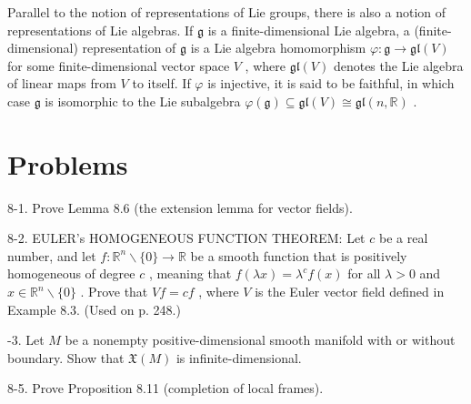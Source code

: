 \begin{definition}
\label{def:8-62-extra-1}
\mathlibok
Parallel to the notion of representations of Lie groups, there is also a notion of representations of Lie algebras. If $\mathfrak{g}$ is a finite-dimensional Lie algebra, a (finite-dimensional) representation of $\mathfrak{g}$ is a Lie algebra homomorphism $\varphi  : \mathfrak{g} \rightarrow  \mathfrak{{gl}}\left( V\right)$ for some finite-dimensional vector space $V$ , where $\mathfrak{{gl}}\left( V\right)$ denotes the Lie algebra of linear maps from $V$ to itself. If $\varphi$ is injective, it is said to be faithful, in which case $\mathfrak{g}$ is isomorphic to the Lie subalgebra $\varphi \left( \mathfrak{g}\right)  \subseteq  \mathfrak{{gl}}\left( V\right)  \cong  \mathfrak{{gl}}\left( {n,\mathbb{R}}\right)$ .
\end{definition}


\section{Problems}

\begin{exercise}
\label{prob:8-1}
\leanok
{}
8-1. Prove Lemma 8.6 (the extension lemma for vector fields).
\end{exercise}

\begin{exercise}
\label{prob:8-2}
\leanok
{}
8-2. EULER's HOMOGENEOUS FUNCTION THEOREM: Let $c$ be a real number, and let $f : {\mathbb{R}}^{n} \smallsetminus  \{ 0\}  \rightarrow  \mathbb{R}$ be a smooth function that is positively homogeneous of degree $c$ , meaning that $f\left( {\lambda x}\right)  = {\lambda }^{c}f\left( x\right)$ for all $\lambda  > 0$ and $x \in  {\mathbb{R}}^{n} \smallsetminus  \{ 0\}$ . Prove that ${Vf} = {cf}$ , where $V$ is the Euler vector field defined in Example 8.3. (Used on p. 248.)
\end{exercise}

\begin{exercise}
\label{prob:8-3}
-3. Let $M$ be a nonempty positive-dimensional smooth manifold with or without boundary. Show that $\mathfrak{X}\left( M\right)$ is infinite-dimensional.
\end{exercise}

\begin{exercise}
\label{prob:8-5}
\leanok
{}
8-5. Prove Proposition 8.11 (completion of local frames).
\end{exercise}

